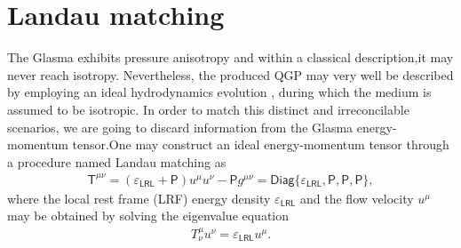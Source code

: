 \section{Landau matching}
The Glasma exhibits pressure anisotropy and within a classical description,it may never reach isotropy. Nevertheless, the produced {\sffamily QGP} may very well be described by employing an ideal hydrodynamics evolution \cite{kolb, huovinen}, during which the medium is assumed to be isotropic. In order to match this distinct and irreconcilable scenarios, we are going to discard information from the Glasma energy-momentum tensor.One may construct an ideal energy-momentum tensor through a procedure named {\sffamily\color{ming} Landau matching} as
\begin{align*}
    \textsf{T}^{\mu \nu}=(\varepsilon_\textsf{LRL}+\textsf{P}) u^{\mu} u^{\nu}-\textsf{P} g^{\mu \nu}=\textsf{Diag}\{\varepsilon_\textsf{LRL}, \textsf{P}, \textsf{P}, \textsf{P}\},
\end{align*}
where the local rest frame ({\sffamily LRF}) energy density $\varepsilon_\textsf{LRL}$ and the flow velocity $u^\mu$ may be obtained by solving the eigenvalue equation
\begin{align}\label{matt}
    T_{\nu}^{\mu} u^{\nu}=\varepsilon_\textsf{LRL} u^{\mu}.
\end{align}

